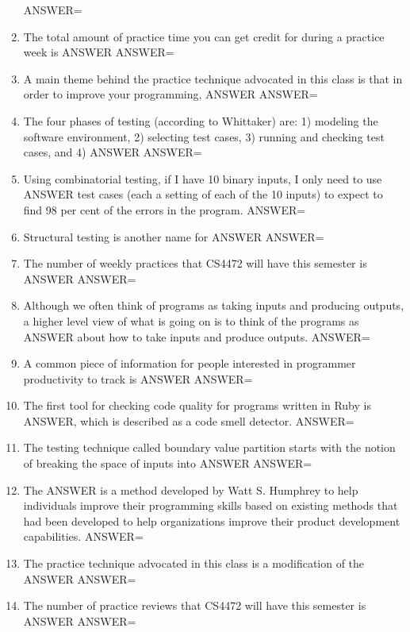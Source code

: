 \documentclass{exam}
\begin{document}
\begin{enumerate}
ANSWER=
\item The total amount of practice time you can get credit for during a practice week is ANSWER\newline
ANSWER=
\item A main theme behind the practice technique advocated in this class is that in order to improve your programming, ANSWER\newline
ANSWER=
\item The four phases of testing (according to Whittaker) are: 1) modeling the software environment, 2) selecting test cases, 3) running and checking test cases, and 4) ANSWER\newline
ANSWER=
\item Using combinatorial testing, if I have 10 binary inputs, I only need to use ANSWER test cases (each a setting of each of the 10 inputs) to expect to find 98 per cent of the errors in the program.\newline
ANSWER=
\item Structural testing is another name for ANSWER\newline
ANSWER=
\item The number of weekly practices that CS4472 will have this semester is ANSWER\newline
ANSWER=
\item Although we often think of programs as taking inputs and producing outputs, a higher level view of what is going on is to think of the programs as ANSWER about how to take inputs and produce outputs.\newline
ANSWER=
\item A common piece of information for people interested in programmer productivity to track is ANSWER\newline
ANSWER=
\item The first tool for checking code quality for programs written in Ruby is ANSWER, which is described as a code smell detector.\newline
ANSWER=
\item The testing technique called boundary value partition starts with the notion of breaking the space of inputs into ANSWER\newline
ANSWER=
\item The ANSWER is a method developed by Watt S. Humphrey to help individuals improve their programming skills based on existing methods that had been developed to help organizations improve their product development capabilities.\newline
ANSWER=
\item The practice technique advocated in this class is a modification of the ANSWER\newline
ANSWER=
\item The number of practice reviews that CS4472 will have this semester is ANSWER\newline
ANSWER=
\end{enumerate}
\end{document}
